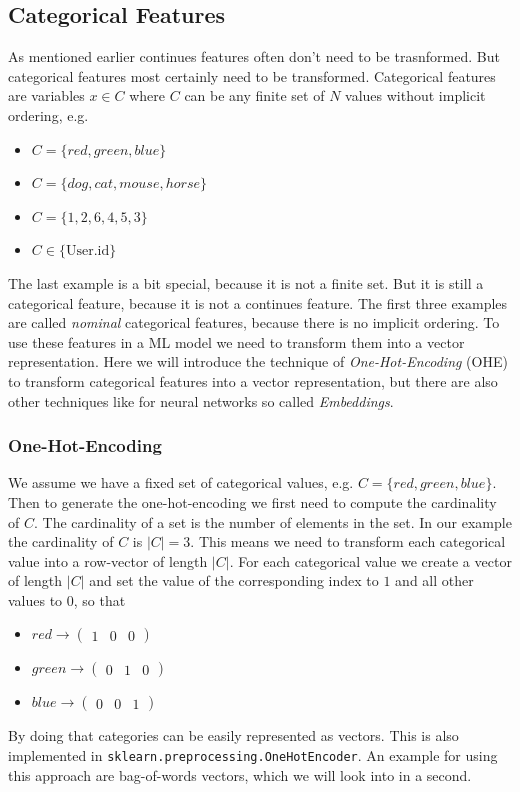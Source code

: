 \documentclass[a4paper]{article}
\begin{document}
\subsection{Categorical Features}
As mentioned earlier continues features often don't need to be trasnformed. But categorical features most certainly need to be transformed.
Categorical features are variables $x \in C$ where $C$ can be any finite set of $N$ values without implicit ordering, e.g.
\begin{itemize}
  \item $C = \{red, green, blue\}$
  \item $C = \{dog, cat, mouse, horse\}$
  \item $C = \{1, 2, 6, 4, 5, 3\}$
  \item $C \in \{\text{User.id}\}$
\end{itemize}
The last example is a bit special, because it is not a finite set. But it is still a categorical feature, because it is not a continues feature.
The first three examples are called \textit{nominal} categorical features, because there is no implicit ordering.
To use these features in a ML model we need to transform them into a vector representation.
Here we will introduce the technique of \textit{One-Hot-Encoding} (OHE) to transform categorical features into a vector representation, but there are also
other techniques like for neural networks so called \textit{Embeddings}.
\subsubsection{One-Hot-Encoding}
We assume we have a fixed set of categorical values, e.g. $C = \{red, green, blue\}$. Then to generate the one-hot-encoding we first need to compute the cardinality of $C$.
The cardinality of a set is the number of elements in the set. In our example the cardinality of $C$ is $|C| = 3$. This means we need to transform each categorical value into a row-vector of length $|C|$.
For each categorical value we create a vector of length $|C|$ and set the value of the corresponding index to $1$ and all other values to $0$, so that
\begin{itemize}
  \item $red \rightarrow \begin{pmatrix}1 & 0 & 0\end{pmatrix}$
  \item $green \rightarrow \begin{pmatrix}0 & 1 & 0\end{pmatrix}$
  \item $blue \rightarrow \begin{pmatrix}0 & 0 & 1\end{pmatrix}$
\end{itemize}
By doing that categories can be easily represented as vectors.
This is also implemented in \lstinline{sklearn.preprocessing.OneHotEncoder}.
An example for using this approach are bag-of-words vectors, which we will look into in a second.
\end{document}
